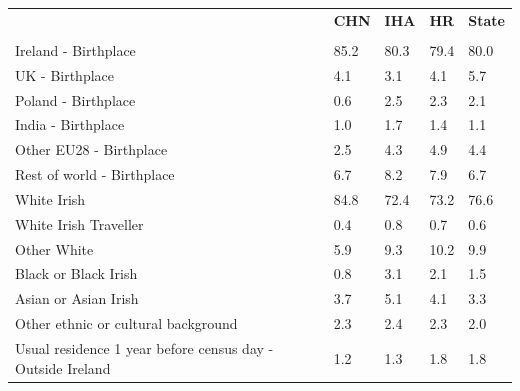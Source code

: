 \documentclass{article}
\begin{document}
\pagebreak
\begin{table}[h]	
\centering
		\begin{tabular}{KTTTT}
  \hline
& \textbf{CHN} & \textbf{IHA} & \textbf{HR}& \textbf{State}\\ 
  \hline
    \\ 
    \hline
Ireland - Birthplace & 85.2& 80.3& 79.4& 80.0\\
UK - Birthplace & 4.1& 3.1& 4.1& 5.7\\
Poland - Birthplace & 0.6& 2.5& 2.3& 2.1\\
India - Birthplace & 1.0& 1.7& 1.4& 1.1\\
Other EU28 - Birthplace & 2.5& 4.3& 4.9& 4.4\\
Rest of world - Birthplace & 6.7& 8.2& 7.9& 6.7\\
    \hline
White Irish & 84.8& 72.4& 73.2& 76.6\\
White Irish Traveller & 0.4& 0.8& 0.7& 0.6\\
Other White &  5.9&  9.3& 10.2&  9.9\\
Black or Black Irish & 0.8& 3.1& 2.1& 1.5\\
Asian or Asian Irish & 3.7& 5.1& 4.1& 3.3\\
Other ethnic or cultural background & 2.3& 2.4& 2.3& 2.0\\
    \hline
Usual residence 1 year before census day - Outside Ireland & 1.2& 1.3& 1.8& 1.8\\


\end{tabular}
\end{table}
\end{document}
